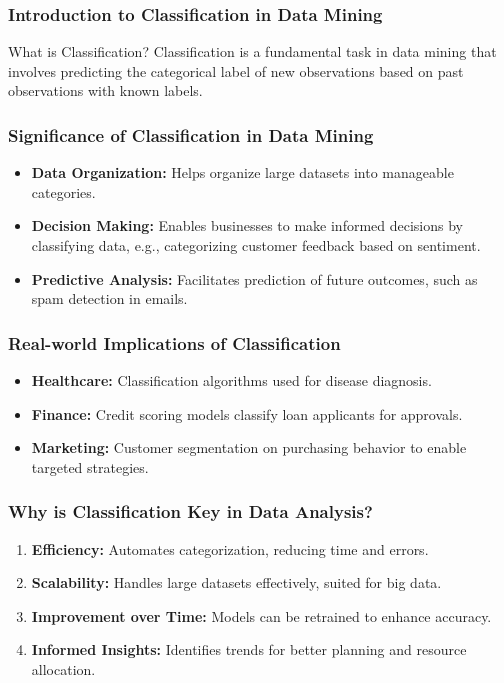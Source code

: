 \documentclass[aspectratio=169]{beamer}
\begin{document}
\frame{\titlepage}

\begin{frame}[fragile]
    \frametitle{Introduction to Classification in Data Mining}
    \begin{block}{What is Classification?}
        Classification is a fundamental task in data mining that involves predicting the categorical label of new observations based on past observations with known labels. 
    \end{block}
\end{frame}

\begin{frame}[fragile]
    \frametitle{Significance of Classification in Data Mining}
    \begin{itemize}
        \item \textbf{Data Organization:} Helps organize large datasets into manageable categories.
        \item \textbf{Decision Making:} Enables businesses to make informed decisions by classifying data, e.g., categorizing customer feedback based on sentiment.
        \item \textbf{Predictive Analysis:} Facilitates prediction of future outcomes, such as spam detection in emails.
    \end{itemize}
\end{frame}

\begin{frame}[fragile]
    \frametitle{Real-world Implications of Classification}
    \begin{itemize}
        \item \textbf{Healthcare:} Classification algorithms used for disease diagnosis.
        \item \textbf{Finance:} Credit scoring models classify loan applicants for approvals.
        \item \textbf{Marketing:} Customer segmentation on purchasing behavior to enable targeted strategies.
    \end{itemize}
\end{frame}

\begin{frame}[fragile]
    \frametitle{Why is Classification Key in Data Analysis?}
    \begin{enumerate}
        \item \textbf{Efficiency:} Automates categorization, reducing time and errors.
        \item \textbf{Scalability:} Handles large datasets effectively, suited for big data.
        \item \textbf{Improvement over Time:} Models can be retrained to enhance accuracy.
        \item \textbf{Informed Insights:} Identifies trends for better planning and resource allocation.
    \end{enumerate}
\end{frame}
\end{document}
